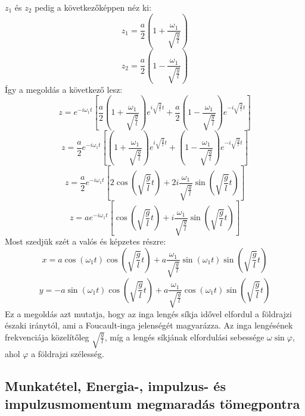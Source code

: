 \documentclass[../main.tex]{subfiles}
\begin{document}
$z_1$ és $z_2$ pedig a következőképpen néz ki:
\begin{equation}
    z_1 = \frac{a}{2}\left(1 + \frac{\omega_1}{\sqrt{\frac{g}{l}}}\right)
\end{equation}
\begin{equation}
    z_2 = \frac{a}{2}\left(1 - \frac{\omega_1}{\sqrt{\frac{g}{l}}}\right)
\end{equation}
Így a megoldás a következő lesz:
\begin{equation}
    z = e^{-i\omega_1 t} \left[\frac{a}{2}\left(1 + \frac{\omega_1}{\sqrt{\frac{g}{l}}}\right) e^{i\sqrt{\frac{g}{l}}t} + \frac{a}{2}\left(1 - \frac{\omega_1}{\sqrt{\frac{g}{l}}}\right) e^{-i\sqrt{\frac{g}{l}}t}\right]
\end{equation}
\begin{equation}
    z = \frac{a}{2} e^{-i\omega_1 t} \left[\left(1 + \frac{\omega_1}{\sqrt{\frac{g}{l}}}\right) e^{i\sqrt{\frac{g}{l}}t} + \left(1 - \frac{\omega_1}{\sqrt{\frac{g}{l}}}\right) e^{-i\sqrt{\frac{g}{l}}t}\right]
\end{equation}
\begin{equation}
    z = \frac{a}{2} e^{-i\omega_1 t} \left[2\cos\left(\sqrt{\frac{g}{l}}t\right) + 2i\frac{\omega_1}{\sqrt{\frac{g}{l}}}\sin\left(\sqrt{\frac{g}{l}}t\right)\right]
\end{equation}
\begin{equation}
    z = a e^{-i\omega_1 t} \left[\cos\left(\sqrt{\frac{g}{l}}t\right) + i\frac{\omega_1}{\sqrt{\frac{g}{l}}}\sin\left(\sqrt{\frac{g}{l}}t\right)\right]
\end{equation}
Most szedjük szét a valós és képzetes részre:
\begin{equation}
    x = a \cos(\omega_1 t) \cos\left(\sqrt{\frac{g}{l}}t\right) + a \frac{\omega_1}{\sqrt{\frac{g}{l}}} \sin(\omega_1 t) \sin\left(\sqrt{\frac{g}{l}}t\right)
\end{equation}
\begin{equation}
    y = -a \sin(\omega_1 t) \cos\left(\sqrt{\frac{g}{l}}t\right) + a \frac{\omega_1}{\sqrt{\frac{g}{l}}} \cos(\omega_1 t) \sin\left(\sqrt{\frac{g}{l}}t\right)
\end{equation}
Ez a megoldás azt mutatja, hogy az inga lengés síkja idővel elfordul a földrajzi északi iránytól, ami a Foucault-inga jelenségét magyarázza. Az inga lengésének frekvenciája közelítőleg $\sqrt{\frac{g}{l}}$, míg a lengés síkjának elfordulási sebessége $\omega \sin \varphi$, ahol $\varphi$ a földrajzi szélesség. 

\subsection{Munkatétel, Energia-, impulzus- és impulzusmomentum megmaradás tömegpontra}
\end{document}
